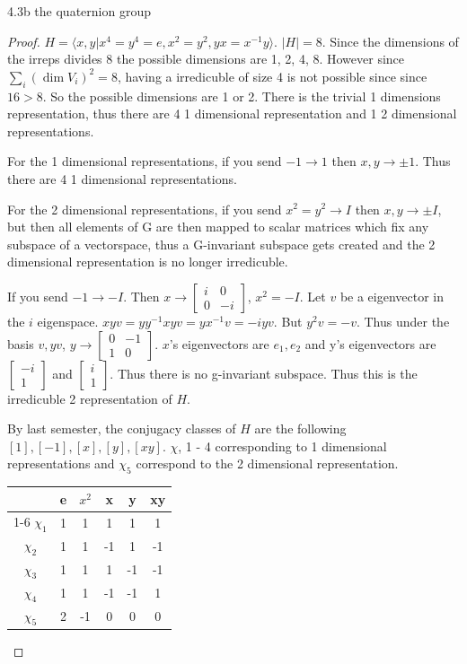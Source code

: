 \documentclass{article}
\newcommand{\angles}[1]{\langle #1 \rangle}
\begin{document}
\begin{PROB}{4.3b}\label{Problem 4.3b.}
    the quaternion group
\end{PROB}
\begin{proof}
    $H = \angles{x, y | x^4 = y^4 = e, x^2 = y^2, yx=x^{-1}y}$. $|H| = 8$. Since the dimensions of the irreps divides 8 the possible dimensions are 1, 2, 4, 8. However since $\sum_{i} (\dim V_i)^2 = 8$, having a irredicuble of size 4 is not possible since since $16 > 8$. So the possible dimensions are 1 or 2. There is the trivial 1 dimensions representation, thus there are 4 1 dimensional representation and 1 2 dimensional representations. 
    
    For the 1 dimensional representations, if you send $-1 \to 1$ then $x, y \to \pm 1$. Thus there are 4 1 dimensional representations. 
    
    For the 2 dimensional representations, if you send $x^2 = y^2 \to I$ then $x, y  \to \pm I$, but then all elements of G are then mapped to scalar matrices which fix any subspace of a vectorspace, thus a G-invariant subspace gets created and the 2 dimensional representation is no longer irredicuble. 

    If you send $-1 \to -I$. Then $x \to \begin{bmatrix}
        i & 0 \\ 0 & -i
    \end{bmatrix}$, $x^2 = -I$. Let $v$ be a eigenvector in the $i$ eigenspace. $xyv = y y^{-1} x y v = y x^{-1} v = -i yv$. But $y^2v = -v$. Thus under the basis $v, yv$, $y \to \begin{bmatrix}
        0 & -1 \\ 1 & 0
    \end{bmatrix}$. $x$'s eigenvectors are $e_1, e_2$ and y's eigenvectors are $\begin{bmatrix}
        -i \\ 1
    \end{bmatrix}$ and $\begin{bmatrix}
        i \\ 1
    \end{bmatrix}$. Thus there is no g-invariant subspace. Thus this is the irredicuble 2 representation of $H$.

    By last semester, the conjugacy classes of $H$ are the following $[1], [-1], [x], [y], [xy]$. $\chi$, 1 - 4 corresponding to 1 dimensional representations and $\chi_5$ correspond to the 2 dimensional representation.     
    
    \begin{tabular}{c | c c c c c }
        & e & $x^2$ & x & y & xy  \\
        \cline{1-6}
        $\chi_1$ & 1 & 1 & 1 & 1 & 1 \\
        $\chi_2$ & 1 & 1 & -1 & 1 & -1 \\
        $\chi_3$ & 1 & 1 & 1 & -1 & -1 \\
        $\chi_4$ & 1 & 1 & -1 & -1 & 1 \\
        $\chi_5$ & 2 & -1 & 0 & 0 & 0 
    \end{tabular} 
\end{proof}
\end{document}
